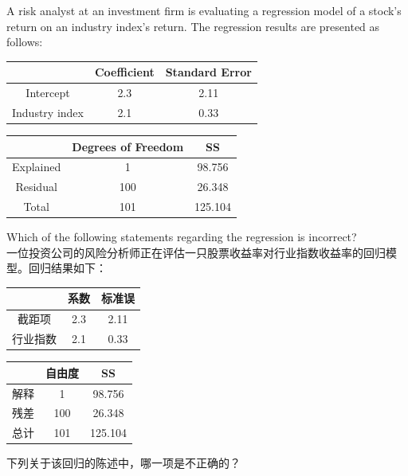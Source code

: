 \documentclass{article}
\newcounter{question} %
\begin{document}
\begin{question}
    A risk analyst at an investment firm is evaluating a regression model of a stock's return on an industry index's return. The regression results are presented as follows: 
    \begin{center}
    \begin{tabular}{ccc}
    \hline
        & Coefficient & Standard Error \\
    \hline
    Intercept & 2.3 & 2.11 \\
    Industry index & 2.1 & 0.33 \\
    \hline
    \end{tabular}
    \end{center}
    \begin{center}
    \begin{tabular}{ccc}
    \hline
        & Degrees of Freedom & SS \\
    \hline
    Explained & 1 & 98.756 \\
    Residual & 100 & 26.348 \\
    Total & 101 & 125.104 \\
    \hline
    \end{tabular}
    \end{center}
    Which of the following statements regarding the regression is incorrect?\\
    一位投资公司的风险分析师正在评估一只股票收益率对行业指数收益率的回归模型。回归结果如下：
    \begin{center}
    \begin{tabular}{ccc}
    \hline
        & 系数 & 标准误 \\
    \hline
    截距项 & 2.3 & 2.11 \\
    行业指数 & 2.1 & 0.33 \\
    \hline
    \end{tabular}
    \end{center}
    \begin{center}
    \begin{tabular}{ccc}
    \hline
        & 自由度 & SS \\
    \hline
    解释 & 1 & 98.756 \\
    残差 & 100 & 26.348 \\
    总计 & 101 & 125.104 \\
    \hline
    \end{tabular}
    \end{center}
    下列关于该回归的陈述中，哪一项是不正确的？\\
    \end{question}
    
\end{document}
